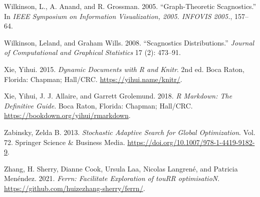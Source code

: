 \begin{CSLReferences}{1}{0}
\leavevmode{}%
Wilkinson, L., A. Anand, and R. Grossman. 2005. {``Graph-Theoretic Scagnostics.''} In \emph{IEEE Symposium on Information Visualization, 2005. INFOVIS 2005.}, 157--64.

\leavevmode{}%
Wilkinson, Leland, and Graham Wills. 2008. {``Scagnostics Distributions.''} \emph{Journal of Computational and Graphical Statistics} 17 (2): 473--91.

\leavevmode{}%
Xie, Yihui. 2015. \emph{Dynamic Documents with {R} and Knitr}. 2nd ed. Boca Raton, Florida: Chapman; Hall/CRC. \url{https://yihui.name/knitr/}.

\leavevmode{}%
Xie, Yihui, J. J. Allaire, and Garrett Grolemund. 2018. \emph{R Markdown: The Definitive Guide}. Boca Raton, Florida: Chapman; Hall/CRC. \url{https://bookdown.org/yihui/rmarkdown}.

\leavevmode{}%
Zabinsky, Zelda B. 2013. \emph{Stochastic Adaptive Search for Global Optimization}. Vol. 72. Springer Science \& Business Media. \url{https://doi.org/10.1007/978-1-4419-9182-9}.

\leavevmode{}%
Zhang, H. Sherry, Dianne Cook, Ursula Laa, Nicolas Langrené, and Patricia Menéndez. 2021. \emph{Ferrn: Facilitate Exploration of touRR optimisatioN}. \url{https://github.com/huizezhang-sherry/ferrn/}.

\end{CSLReferences}



\address{%
H. Sherry Zhang\\
Monash University\\%
Department of Econometrics and Business Statistics\\ Melbourne, Australia\\
%
%
%
\href{mailto:huize.zhang@monash.edu}{\nolinkurl{huize.zhang@monash.edu}}%
}

\address{%
Dianne Cook\\
Monash University\\%
Department of Econometrics and Business Statistics\\ Melbourne, Australia\\
%
%
%
\href{mailto:dicook@monash.edu}{\nolinkurl{dicook@monash.edu}}%
}

\address{%
Ursula Laa\\
University of Natural Resources and Life Sciences\\%
Institute of Statistics\\ Vienna, Austria\\
%
%
%
\href{mailto:ursula.laa@boku.ac.at}{\nolinkurl{ursula.laa@boku.ac.at}}%
}

